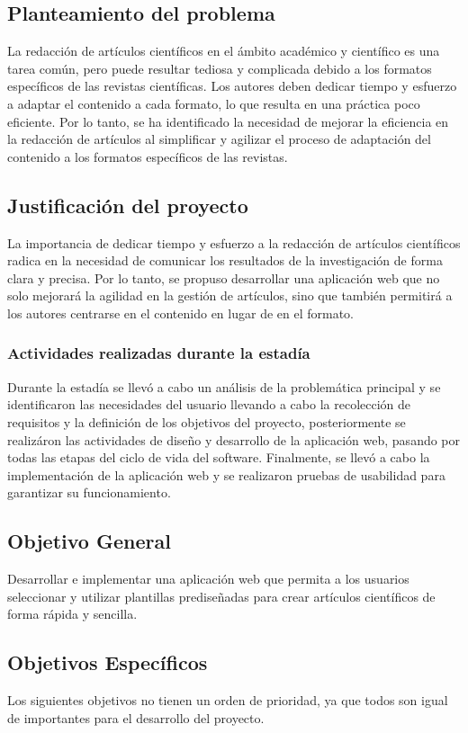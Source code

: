 \subsection{Planteamiento del problema}
La redacción de artículos científicos en el ámbito académico y científico es una tarea común, pero puede resultar tediosa y complicada debido a los formatos específicos de las revistas científicas. Los autores deben dedicar tiempo y esfuerzo a adaptar el contenido a cada formato, lo que resulta en una práctica poco eficiente. Por lo tanto, se ha identificado la necesidad de mejorar la eficiencia en la redacción de artículos al simplificar y agilizar el proceso de adaptación del contenido a los formatos específicos de las revistas. 

\subsection{Justificación del proyecto}
La importancia de dedicar tiempo y esfuerzo a la redacción de artículos científicos radica en la necesidad de comunicar los resultados de la investigación de forma clara y precisa. Por lo tanto, se propuso desarrollar una aplicación web que no solo mejorará la agilidad en la gestión de artículos, sino que también permitirá a los autores centrarse en el contenido en lugar de en el formato.

\subsubsection{Actividades realizadas durante la estadía}
Durante la estadía se llevó a cabo un análisis de la problemática principal y se identificaron las necesidades del usuario llevando a cabo la recolección de requisitos y la definición de los objetivos del proyecto, posteriormente se realizáron las actividades de diseño y desarrollo de la aplicación web, pasando por todas las etapas del ciclo de vida del software. Finalmente, se llevó a cabo la implementación de la aplicación web y se realizaron pruebas de usabilidad para garantizar su funcionamiento.

\subsection{Objetivo General}
Desarrollar e implementar una aplicación web que permita a los usuarios seleccionar y utilizar plantillas prediseñadas para crear artículos científicos de forma rápida y sencilla.

\subsection{Objetivos Específicos}
Los siguientes objetivos no tienen un orden de prioridad, ya que todos son igual de importantes para el desarrollo del proyecto.


